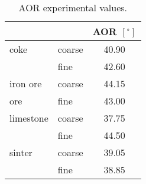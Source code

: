 \begin{table}[h!]
\centering
\begin{tabular}{ll|c}
\hline
          &       & AOR $[^\circ]$ \\
\hline
    coke  & coarse & 40.90 \\
      & fine  & 42.60 \\
\hline      
    iron ore & coarse & 44.15 \\
     ore & fine  & 43.00 \\
\hline     
    limestone & coarse & 37.75 \\
     & fine  & 44.50 \\
\hline     
    sinter & coarse & 39.05 \\
     & fine  & 38.85 \\
             \hline
\end{tabular}
\caption{AOR experimental values.}
\label{tab:23aor}
\end{table}
